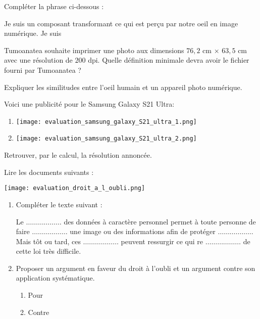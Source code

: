 \documentclass[a4paper]{article}
\begin{document}
\bigskip

\exo[1 point] Compléter la phrase ci-dessous :

\begin{center}
  \og{}Je suis un composant transformant ce qui est perçu par notre oeil en image numérique. Je suis \dotfill\fg{}
\end{center}

\bigskip

\exo[3 points] Tumoanatea souhaite imprimer une photo aux dimensions $76,2$ cm $\times$ $63,5$ cm avec une résolution de $200$ dpi. Quelle définition minimale devra avoir le fichier fourni par Tumoanatea ?

\bigskip

\exo[3 points] Expliquer les similitudes entre l'oeil humain et un appareil photo numérique.

\pagebreak

\exo[3 points] Voici une publicité pour le Samsung Galaxy S21 Ultra:

\medskip

\begin{multicols}{2}
  \begin{enumerate}
    \item [] \texttt{[image: evaluation\_samsung\_galaxy\_S21\_ultra\_1.png]}
    \item [] \texttt{[image: evaluation\_samsung\_galaxy\_S21\_ultra\_2.png]}
  \end{enumerate}
  Retrouver, par le calcul, la résolution annoncée.
\end{multicols}

\medskip


\bigskip

\exo[3 points] Lire les documents suivants :

\begin{center}
  \texttt{[image: evaluation\_droit\_a\_l\_oubli.png]}
\end{center}

\begin{enumerate}
  \item Compléter le texte suivant :

    \medskip

    Le $\hdots\hdots\hdots\hdots\hdots\hdots$ des données à caractère personnel permet à toute personne de faire $\hdots\hdots\hdots\hdots\hdots\hdots$ une image ou des informations afin de protéger $\hdots\hdots\hdots\hdots\hdots\hdots$ Mais tôt ou tard, ces $\hdots\hdots\hdots\hdots\hdots\hdots$ peuvent ressurgir ce qui re $\hdots\hdots\hdots\hdots\hdots\hdots$ de cette loi très difficile.
  \item Proposer un argument en faveur du droit à l'oubli et un argument contre son application systématique.
    \begin{multicols}{2}
      \begin{enumerate}
	\item Pour
	\item Contre
      \end{enumerate} 
    \end{multicols}
\end{enumerate}
\end{document}

